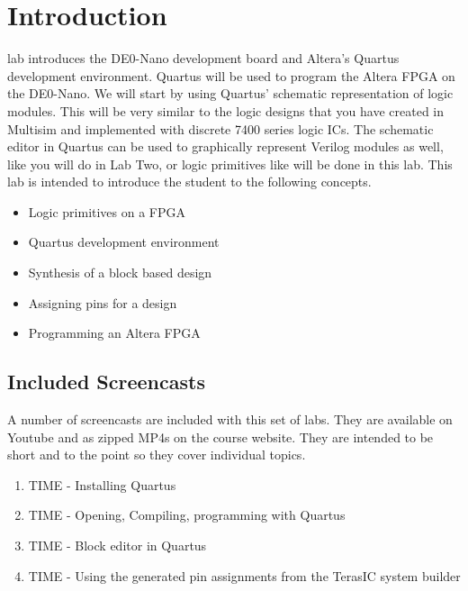 \documentclass[12pt,journal]{IEEEtran}
\begin{document}




  \section{Introduction}
     lab introduces the DE0-Nano development board and Altera's Quartus development environment. Quartus will be used to program the Altera FPGA on the DE0-Nano. We will start by using Quartus' schematic representation of logic modules. This will be very similar to the logic designs that you have created in Multisim and implemented with discrete 7400 series logic ICs. The schematic editor in Quartus can be used to graphically represent Verilog modules as well, like you will do in Lab Two, or logic primitives like will be done in this lab. This lab is intended to introduce the student to the following concepts.
    \begin{itemize}
       \item Logic primitives on a FPGA
       \item Quartus development environment
       \item Synthesis of a block based design
       \item Assigning pins for a design
       \item Programming an Altera FPGA
    \end{itemize}

    \subsection{Included Screencasts}
      A number of screencasts are included with this set of labs. They are available on Youtube and as zipped MP4s on the course website. They are intended to be short and to the point so they cover individual topics.
      \begin{enumerate}
        \item TIME - Installing Quartus
        \item TIME - Opening, Compiling, programming with Quartus
        \item TIME - Block editor in Quartus
        \item TIME - Using the generated pin assignments from the TerasIC system builder
      \end{enumerate}
\end{document}
